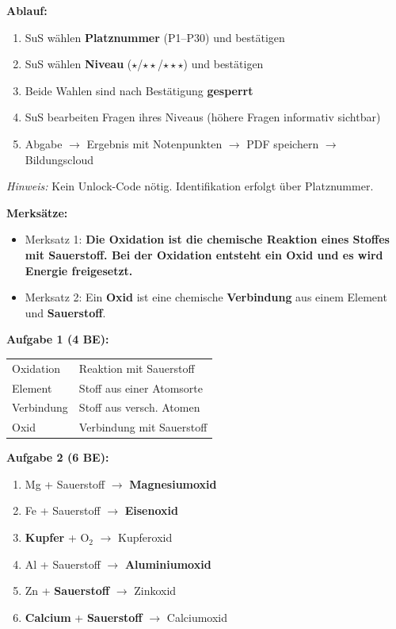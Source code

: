 \documentclass[11pt, a4paper]{article}
\newcommand{\abschnitt}[1]{%
    \vspace{10pt}%
    \noindent{\large\bfseries\textcolor{fachfarbe}{#1}}%
    \vspace{6pt}%
    \nopagebreak[4]%
}
\newcommand{\lsg}[1]{\textcolor{loesung}{\textbf{#1}}}
\begin{document}
\textbf{Ablauf:}
\begin{enumerate}[leftmargin=1.5em, itemsep=0pt]
    \item SuS wählen \textbf{Platznummer} (P1--P30) und bestätigen
    \item SuS wählen \textbf{Niveau} ($\star$/$\star\star$/$\star\star\star$) und bestätigen
    \item Beide Wahlen sind nach Bestätigung \textbf{gesperrt}
    \item SuS bearbeiten Fragen ihres Niveaus (höhere Fragen informativ sichtbar)
    \item Abgabe $\rightarrow$ Ergebnis mit Notenpunkten $\rightarrow$ PDF speichern $\rightarrow$ Bildungscloud
\end{enumerate}

\textit{Hinweis:} Kein Unlock-Code nötig. Identifikation erfolgt über Platznummer.


\newpage

\abschnitt{Lösungen zum Arbeitsblatt}

\textbf{Merksätze:}
\begin{itemize}[leftmargin=1.5em, itemsep=2pt]
    \item Merksatz 1: \lsg{Die Oxidation ist die chemische Reaktion eines Stoffes mit Sauerstoff. Bei der Oxidation entsteht ein Oxid und es wird Energie freigesetzt.}
    \item Merksatz 2: Ein \lsg{Oxid} ist eine chemische \lsg{Verbindung} aus einem Element und \lsg{Sauerstoff}.
\end{itemize}

\textbf{Aufgabe 1 (4 BE):}
\begin{tabular}{ll}
Oxidation & Reaktion mit Sauerstoff \\
Element & Stoff aus einer Atomsorte \\
Verbindung & Stoff aus versch. Atomen \\
Oxid & Verbindung mit Sauerstoff
\end{tabular}

\textbf{Aufgabe 2 (6 BE):}
\begin{enumerate}[label=\alph*), leftmargin=1.5em, itemsep=0pt]
    \item Mg + Sauerstoff $\rightarrow$ \lsg{Magnesiumoxid}
    \item Fe + Sauerstoff $\rightarrow$ \lsg{Eisenoxid}
    \item \lsg{Kupfer} + O$_2$ $\rightarrow$ Kupferoxid
    \item Al + Sauerstoff $\rightarrow$ \lsg{Aluminiumoxid}
    \item Zn + \lsg{Sauerstoff} $\rightarrow$ Zinkoxid
    \item \lsg{Calcium} + \lsg{Sauerstoff} $\rightarrow$ Calciumoxid
\end{enumerate}
\end{document}
